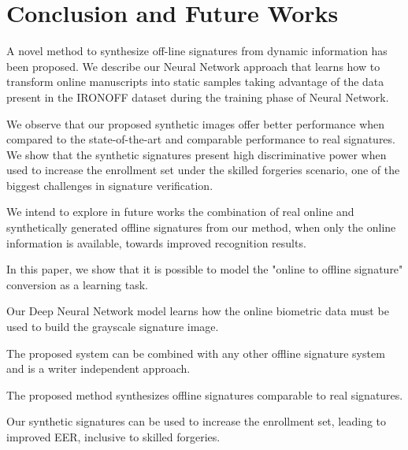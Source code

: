 
\chapter{Conclusion and Future Works}\label{ch:conclusion}

A novel method to synthesize off-line signatures
from dynamic information has been proposed. We describe our Neural Network approach that learns how to transform online manuscripts into static samples taking advantage of the data present in the IRONOFF dataset during the training phase of Neural Network. 

We observe that our proposed synthetic images offer better performance when compared to the state-of-the-art and comparable performance to real signatures. We show that the synthetic signatures present high discriminative power when used to increase the enrollment set under the skilled forgeries scenario, one of the biggest challenges in signature verification. 

We intend to explore in future works the combination of real online and
synthetically generated offline signatures from our method, when only the online information is available, towards improved recognition results.

In this paper, we show that it is possible to model the "online to offline signature" conversion as a learning task.
 
Our Deep Neural Network model learns how the online biometric data must be used to build the grayscale signature image.
 
The proposed system can be combined with any other offline signature system and is a writer independent approach.
 
The proposed method synthesizes offline signatures comparable to real signatures.
 
Our synthetic signatures can be used to increase the enrollment set, leading to improved EER, inclusive to skilled forgeries. 
